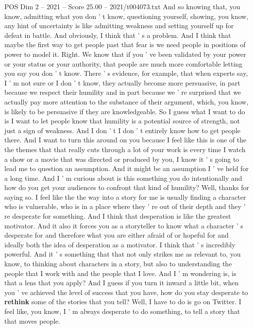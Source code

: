 \begin{textsample}{POS Dim 2 – 2021 – Score 25.00 – 2021/t004073.txt}
And so knowing that, you know, admitting what you don ' t know, questioning yourself, showing, you know, any hint of uncertainty is like admitting weakness and setting yourself up for defeat in battle.
And obviously, I think that ' s a problem.
And I think that maybe the first way to get people past that fear is we need people in positions of power to model it.
Right.
We know that if you ' ve been validated by your power or your status or your authority, that people are much more comfortable letting you say you don ' t know.
There ' s evidence, for example, that when experts say, I ' m not sure or I don ' t know, they actually become more persuasive, in part because we respect their humility and in part because we ' re surprised that we actually pay more attention to the substance of their argument, which, you know, is likely to be persuasive if they are knowledgeable.
So I guess what I want to do is I want to let people know that humility is a potential source of strength, not just a sign of weakness.
And I don ' t I don ' t entirely know how to get people there.
And I want to turn this around on you because I feel like this is one of the the themes that that really cuts through a lot of your work is every time I watch a show or a movie that was directed or produced by you, I know it ' s going to lead me to question an assumption.
And it might be an assumption I ' ve held for a long time.
And I ' m curious about is this something you do intentionally and how do you get your audiences to confront that kind of humility?
Well, thanks for saying so.
I feel like the the way into a story for me is usually finding a character who is vulnerable, who is in a place where they ' re out of their depth and they ' re desperate for something.
And I think that desperation is like the greatest motivator.
And it also it forces you as a storyteller to know what a character ' s desperate for and therefore what you are either afraid of or hopeful for and ideally both the idea of desperation as a motivator.
I think that ' s incredibly powerful.
And it ' s something that that not only strikes me as relevant to, you know, to thinking about characters in a story, but also to understanding the people that I work with and the people that I love.
And I ' m wondering is, is that a lens that you apply?
And I guess if you turn it inward a little bit, when you ' ve achieved the level of success that you have, how do you stay desperate to \textbf{rethink} some of the stories that you tell?
Well, I have to do is go on Twitter.
I feel like, you know, I ' m always desperate to do something, to tell a story that that moves people.

\end{textsample}
